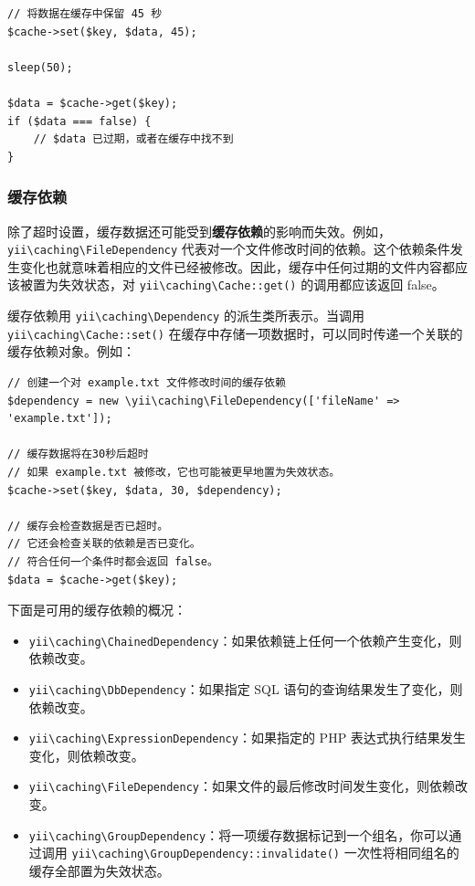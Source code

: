 \lstset{language=php}\begin{lstlisting}
// 将数据在缓存中保留 45 秒
$cache->set($key, $data, 45);

sleep(50);

$data = $cache->get($key);
if ($data === false) {
    // $data 已过期，或者在缓存中找不到
}
\end{lstlisting}
\subsubsection{缓存依赖 \label{caching-data.md::cache-dependencies}}
除了超时设置，缓存数据还可能受到\textbf{缓存依赖}的影响而失效。例如，\texttt{yii{\allowbreak{}\textbackslash}caching{\allowbreak{}\textbackslash}FileDependency} 代表对一个文件修改时间的依赖。这个依赖条件发生变化也就意味着相应的文件已经被修改。因此，缓存中任何过期的文件内容都应该被置为失效状态，对 \texttt{yii{\allowbreak{}\textbackslash}caching{\allowbreak{}\textbackslash}Cache\allowbreak{}::\allowbreak{}get()} 的调用都应该返回 false。

缓存依赖用 \texttt{yii{\allowbreak{}\textbackslash}caching{\allowbreak{}\textbackslash}Dependency} 的派生类所表示。当调用 \texttt{yii{\allowbreak{}\textbackslash}caching{\allowbreak{}\textbackslash}Cache\allowbreak{}::\allowbreak{}set()} 在缓存中存储一项数据时，可以同时传递一个关联的缓存依赖对象。例如：

\lstset{language=php}\begin{lstlisting}
// 创建一个对 example.txt 文件修改时间的缓存依赖
$dependency = new \yii\caching\FileDependency(['fileName' => 'example.txt']);

// 缓存数据将在30秒后超时
// 如果 example.txt 被修改，它也可能被更早地置为失效状态。
$cache->set($key, $data, 30, $dependency);

// 缓存会检查数据是否已超时。
// 它还会检查关联的依赖是否已变化。
// 符合任何一个条件时都会返回 false。
$data = $cache->get($key);
\end{lstlisting}
下面是可用的缓存依赖的概况：

\begin{itemize}
\item \texttt{yii{\allowbreak{}\textbackslash}caching{\allowbreak{}\textbackslash}ChainedDependency}：如果依赖链上任何一个依赖产生变化，则依赖改变。
\item \texttt{yii{\allowbreak{}\textbackslash}caching{\allowbreak{}\textbackslash}DbDependency}：如果指定 SQL 语句的查询结果发生了变化，则依赖改变。
\item \texttt{yii{\allowbreak{}\textbackslash}caching{\allowbreak{}\textbackslash}ExpressionDependency}：如果指定的 PHP 表达式执行结果发生变化，则依赖改变。
\item \texttt{yii{\allowbreak{}\textbackslash}caching{\allowbreak{}\textbackslash}FileDependency}：如果文件的最后修改时间发生变化，则依赖改变。
\item \texttt{yii{\allowbreak{}\textbackslash}caching{\allowbreak{}\textbackslash}GroupDependency}：将一项缓存数据标记到一个组名，你可以通过调用 \texttt{yii{\allowbreak{}\textbackslash}caching{\allowbreak{}\textbackslash}GroupDependency\allowbreak{}::\allowbreak{}invalidate()} 一次性将相同组名的缓存全部置为失效状态。
\end{itemize}
